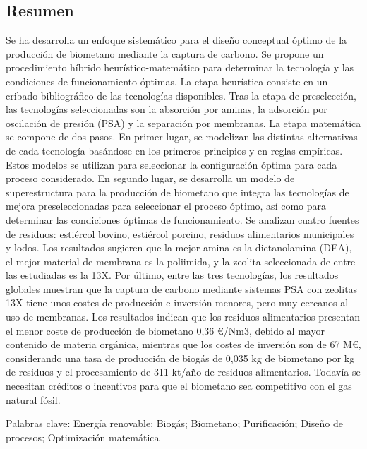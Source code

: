 \begin{refsection}[referencesCh7]
\section*{Resumen}
Se ha desarrolla un enfoque sistemático para el diseño conceptual óptimo de la producción de biometano mediante la captura de carbono. Se propone un procedimiento híbrido heurístico-matemático para determinar la tecnología y las condiciones de funcionamiento óptimas. La etapa heurística consiste en un cribado bibliográfico de las tecnologías disponibles. Tras la etapa de preselección, las tecnologías seleccionadas son la absorción por aminas, la adsorción por oscilación de presión (PSA) y la separación por membranas. La etapa matemática se compone de dos pasos. En primer lugar, se modelizan las distintas alternativas de cada tecnología basándose en los primeros principios y en reglas empíricas. Estos modelos se utilizan para seleccionar la configuración óptima para cada proceso considerado. En segundo lugar, se desarrolla un modelo de superestructura para la producción de biometano que integra las tecnologías de mejora preseleccionadas para seleccionar el proceso óptimo, así como para determinar las condiciones óptimas de funcionamiento. Se analizan cuatro fuentes de residuos: estiércol bovino, estiércol porcino, residuos alimentarios municipales y lodos. Los resultados sugieren que la mejor amina es la dietanolamina (DEA), el mejor material de membrana es la poliimida, y la zeolita seleccionada de entre las estudiadas es la 13X. Por último, entre las tres tecnologías, los resultados globales muestran que la captura de carbono mediante sistemas PSA con zeolitas 13X tiene unos costes de producción e inversión menores, pero muy cercanos al uso de membranas. Los resultados indican que los residuos alimentarios presentan el menor coste de producción de biometano 0,36 €/Nm3, debido al mayor contenido de materia orgánica, mientras que los costes de inversión son de 67 M€, considerando una tasa de producción de biogás de 0,035 kg de biometano por kg de residuos y el procesamiento de 311 kt/año de residuos alimentarios. Todavía se necesitan créditos o incentivos para que el biometano sea competitivo con el gas natural fósil.

\bigskip
Palabras clave: Energía renovable; Biogás; Biometano; Purificación; Diseño de procesos; Optimización matemática
\newpage


\end{refsection}
